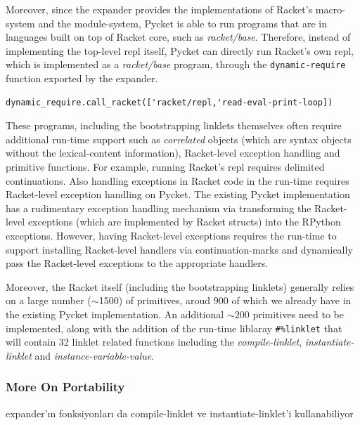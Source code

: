 Moreover, since the expander provides the implementations of Racket's
macro-system and the module-system, Pycket is able to run programs
that are in languages built on top of Racket core, such as
\emph{racket/base}. Therefore, instead of implementing the top-level
repl itself, Pycket can directly run Racket's own repl, which is
implemented as a \emph{racket/base} program, through the
\verb|dynamic-require| function exported by the expander.

{\footnotesize
\begin{lstlisting}[mathescape]
  dynamic_require.call_racket(['racket/repl,'read-eval-print-loop])
\end{lstlisting}
}

These programs, including the bootstrapping linklets themselves often
require additional run-time support such as \emph{correlated} objects
(which are syntax objects without the lexical-content information),
Racket-level exception handling and primitive functions. For example,
running Racket's repl requires delimited continuations. Also handling
exceptions in Racket code in the run-time requires Racket-level
exception handling on Pycket. The existing Pycket implementation has a
rudimentary exception handling mechanism via transforming the
Racket-level exceptions (which are implemented by Racket structs) into
the RPython exceptions. However, having Racket-level exceptions
requires the run-time to support installing Racket-level handlers via
continuation-marks and dynamically pass the Racket-level exceptions to
the appropriate handlers.

Moreover, the Racket itself (including the bootstrapping linklets)
generally relies on a large number ($\sim$1500) of primitives, aroud 900
of which we already have in the existing Pycket implementation. An
additional $\sim$200 primitives need to be implemented, along with the
addition of the run-time liblaray \texttt{\#\%linklet} that will
contain 32 linklet related functions including the
\emph{compile-linklet}, \emph{instantiate-linklet} and
\emph{instance-variable-value}.

\subsubsection{More On Portability}
\label{subsec:more-portability}

expander'ın fonksiyonları da compile-linklet ve instantiate-linklet'i kullanabiliyor

